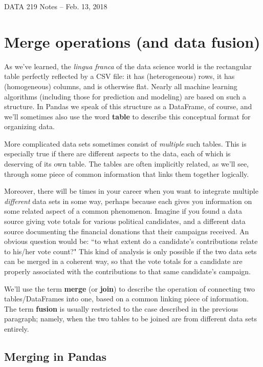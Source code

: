 \documentclass[12pt]{article}
\begin{document}
\begin{center}
\begin{Large}
DATA 219 Notes -- Feb. 13, 2018
\end{Large}
\end{center}

\section{Merge operations (and data fusion)}

As we've learned, the \textit{lingua franca} of the data science world is the
rectangular table perfectly reflected by a CSV file: it has (heterogeneous)
rows, it has (homogeneous) columns, and is otherwise flat. Nearly all machine
learning algorithms (including those for prediction and modeling) are based on
such a structure. In Pandas we speak of this structure as a DataFrame, of
course, and we'll sometimes also use the word \textbf{table} to describe this
conceptual format for organizing data.

More complicated data sets sometimes consist of \textit{multiple} such tables.
This is especially true if there are different aspects to the data, each of
which is deserving of its own table. The tables are often implicitly related,
as we'll see, through some piece of common information that links them
together logically.

Moreover, there will be times in your career when you want to integrate
multiple \textit{different} data sets in some way, perhaps because each gives
you information on some related aspect of a common phenomenon. Imagine if you
found a data source giving vote totals for various political candidates, and a
different data source documenting the financial donations that their campaigns
received. An obvious question would be: ``to what extent do a candidate's
contributions relate to his/her vote count?" This kind of analysis is only
possible if the two data sets can be merged in a coherent way, so that the
vote totals for a candidate are properly associated with the contributions to
that same candidate's campaign.

We'll use the term \textbf{merge} (or \textbf{join}) to describe the operation
of connecting two tables/DataFrames into one, based on a common linking piece
of information. The term \textbf{fusion} is usually restricted to the case
described in the previous paragraph; namely, when the two tables to be joined
are from different data sets entirely.

\subsection{Merging in Pandas}
\end{document}
